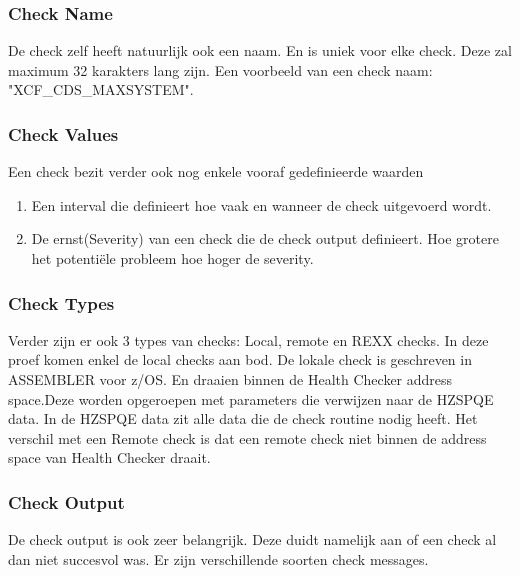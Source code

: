 \subsubsection{Check Name}
\label{subsubsec:Check Name}

De check zelf heeft natuurlijk ook een naam. En is uniek voor elke check. Deze zal maximum 32 karakters lang zijn. Een voorbeeld van een check naam: "XCF\_CDS\_MAXSYSTEM".

\subsubsection{Check Values}
\label{subsubsec:Check Values}

Een check bezit verder ook nog enkele vooraf gedefinieerde waarden

\begin{enumerate}
	\item Een interval die definieert hoe vaak en wanneer de check uitgevoerd wordt.
	\item De ernst(Severity) van een check die de check output definieert. Hoe grotere het potentiële probleem hoe hoger de severity. 
\end{enumerate}

\subsubsection{Check Types}
\label{subsubsec:Check Type}

Verder zijn er ook 3 types van checks: Local, remote en REXX checks. In deze proef komen enkel de local checks aan bod. De lokale check is geschreven in ASSEMBLER voor z/OS. En draaien binnen de Health Checker address space.Deze worden opgeroepen met parameters die verwijzen naar de HZSPQE data. In de HZSPQE data zit alle data die de check routine nodig heeft. Het verschil met een Remote check is dat een remote check niet binnen de address space van Health Checker draait. 

\subsubsection{Check Output}
\label{subsubsec:Check Output}

 De check output is ook zeer belangrijk. Deze duidt namelijk aan of een check al dan niet succesvol was. Er zijn verschillende soorten check messages.


